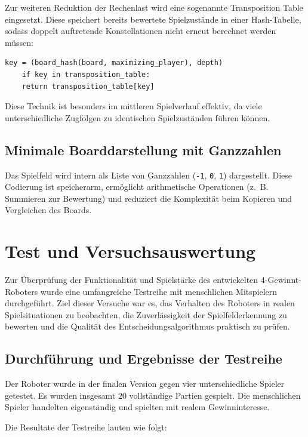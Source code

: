 Zur weiteren Reduktion der Rechenlast wird eine sogenannte Transposition Table eingesetzt. Diese speichert bereits bewertete Spielzustände in einer Hash-Tabelle, sodass doppelt auftretende Konstellationen nicht erneut berechnet werden müssen:

\begin{lstlisting}[style=pythonstyle]
	key = (board_hash(board, maximizing_player), depth)
	if key in transposition_table:
	return transposition_table[key]
\end{lstlisting}

Diese Technik ist besonders im mittleren Spielverlauf effektiv, da viele unterschiedliche Zugfolgen zu identischen Spielzuständen führen können.

\subsection{Minimale Boarddarstellung mit Ganzzahlen}

Das Spielfeld wird intern als Liste von Ganzzahlen (\texttt{-1}, \texttt{0}, \texttt{1}) dargestellt. Diese Codierung ist speicherarm, ermöglicht arithmetische Operationen (z.~B. Summieren zur Bewertung) und reduziert die Komplexität beim Kopieren und Vergleichen des Boards.

\section{Test und Versuchsauswertung}

Zur Überprüfung der Funktionalität und Spielstärke des entwickelten 4-Gewinnt-Roboters wurde eine umfangreiche Testreihe mit menschlichen Mitspielern durchgeführt. Ziel dieser Versuche war es, das Verhalten des Roboters in realen Spielsituationen zu beobachten, die Zuverlässigkeit der Spielfelderkennung zu bewerten und die Qualität des Entscheidungsalgorithmus praktisch zu prüfen.

\subsection{Durchführung und Ergebnisse der Testreihe}

Der Roboter wurde in der finalen Version gegen vier unterschiedliche Spieler getestet. 
Es wurden insgesamt 20 vollständige Partien gespielt. Die menschlichen Spieler handelten eigenständig und spielten mit realem Gewinninteresse.

Die Resultate der Testreihe lauten wie folgt:

